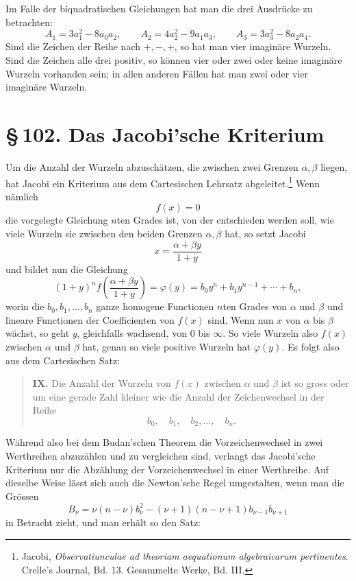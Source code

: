 \documentclass[11pt]{article}
\providecommand{\sect}[2]{\section*{\S\,#1. #2}}
\begin{document}
Im Falle der biquadratischen Gleichungen hat man die drei Ausdrücke zu betrachten:
\[
        A_1=3a_1^2-8a_0a_2,\qquad
        A_2=4a_2^2-9a_1a_3,\qquad
        A_3=3a_3^2-8a_2a_4.
\]
Sind die Zeichen der Reihe nach $+,-,+$, so hat man vier imaginäre Wurzeln. Sind die Zeichen alle drei positiv, so können vier oder zwei oder keine imaginäre Wurzeln vorhanden sein; in allen anderen Fällen hat man zwei oder vier imaginäre Wurzeln.

\sect{102}{Das Jacobi'sche Kriterium}

Um die Anzahl der Wurzeln abzuschätzen, die zwischen zwei Grenzen $\alpha,\beta$ liegen, hat Jacobi ein Kriterium aus dem Cartesischen Lehrsatz abgeleitet.\footnote{Jacobi, \emph{Observatiunculae ad theoriam aequationum algebraicarum pertinentes}. Crelle's Journal, Bd. 13. Gesammelte Werke, Bd. III.} Wenn nämlich
\begin{equation}
        f(x)=0
\tag{1}
\end{equation}
die vorgelegte Gleichung $n$ten Grades ist, von der entschieden werden soll, wie viele Wurzeln sie zwischen den beiden Grenzen $\alpha,\beta$ hat, so setzt Jacobi
\begin{equation}
        x=\frac{\alpha+\beta y}{1+y}
\tag{2}
\end{equation}
und bildet nun die Gleichung
\begin{equation}
        (1+y)^n f\!\left(\frac{\alpha+\beta y}{1+y}\right)
        =\varphi(y)=b_0y^n+b_1y^{n-1}+\cdots+b_n,
\tag{3}
\end{equation}
worin die $b_0,b_1,\ldots,b_n$ ganze homogene Functionen $n$ten Grades von $\alpha$ und $\beta$ und lineare Functionen der Coefficienten von $f(x)$ sind. Wenn nun $x$ von $\alpha$ bis $\beta$ wächst, so geht $y$, gleichfalls wachsend, von $0$ bis $\infty$. So viele Wurzeln also $f(x)$ zwischen $\alpha$ und $\beta$ hat, genau so viele positive Wurzeln hat $\varphi(y)$. Es folgt also aus dem Cartesischen Satz:

\begin{quote}
\textbf{IX.} Die Anzahl der Wurzeln von $f(x)$ zwischen $\alpha$ und $\beta$ ist so gross oder um eine gerade Zahl kleiner wie die Anzahl der Zeichenwechsel in der Reihe
\[
        b_0,\quad b_1,\quad b_2,\ldots,\quad b_n.
\]
\end{quote}

Während also bei dem Budan'schen Theorem die Vorzeichenwechsel in zwei Werthreihen abzuzählen und zu vergleichen sind, verlangt das Jacobi'sche Kriterium nur die Abzählung der Vorzeichenwechsel in einer Werthreihe. Auf dieselbe Weise lässt sich auch die Newton'sche Regel umgestalten, wenn man die Grössen
\[
        B_\nu=\nu(n-\nu)b_\nu^2-(\nu+1)(n-\nu+1)b_{\nu-1}b_{\nu+1}
\]
in Betracht zieht, und man erhält so den Satz:
\end{document}
